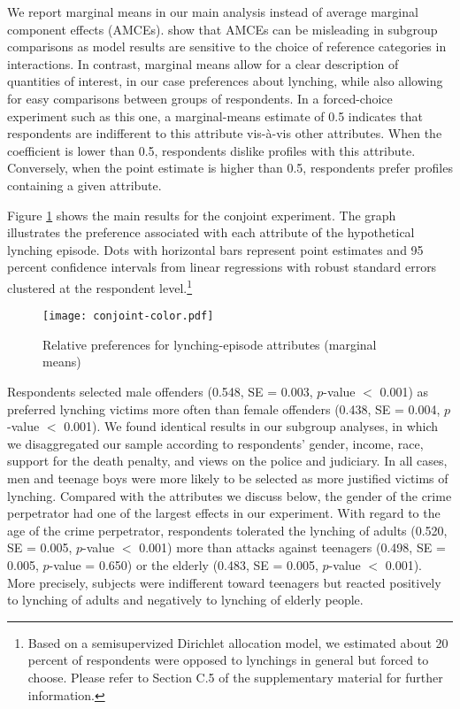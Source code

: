 \documentclass[12pt,a4paper]{article}
\begin{document}
We report marginal means in our main analysis instead of average marginal
component effects (AMCEs). \citet{leeper2018subgroup} show that AMCEs can be
misleading in subgroup comparisons as model results are sensitive to the choice
of reference categories in interactions. In contrast, marginal means allow for
a clear description of quantities of interest, in our case preferences about
lynching, while also allowing for easy comparisons between groups of
respondents. In a forced-choice experiment such as this one, a marginal-means
estimate of 0.5 indicates that respondents are indifferent to this attribute
vis-à-vis other attributes. When the coefficient is lower than 0.5, respondents
dislike profiles with this attribute. Conversely, when the point estimate is
higher than 0.5, respondents prefer profiles containing a given attribute.

Figure \ref{fig:exp01} shows the main results for the conjoint experiment. The
graph illustrates the preference associated with each attribute of the
hypothetical lynching episode. Dots with horizontal bars represent point
estimates and 95 percent confidence intervals from linear regressions with
robust standard errors clustered at the respondent level.\footnote{Based on a
semisupervized Dirichlet allocation model, we estimated about 20 percent of
respondents were opposed to lynchings in general but forced to choose. Please
refer to Section C.5 of the supplementary material for further information.}

\begin{figure}[ht]
\texttt{[image: conjoint-color.pdf]}
\caption{Relative preferences for lynching-episode attributes (marginal means)}
\centering
\label{fig:exp01}
\end{figure}

Respondents selected male offenders (0.548, SE = 0.003, $p$-value $<$ 0.001) as
preferred lynching victims more often than female offenders (0.438, SE = 0.004,
$p$-value $<$ 0.001). We found identical results in our subgroup analyses, in
which we disaggregated our sample according to respondents' gender, income,
race, support for the death penalty, and views on the police and judiciary. In
all cases, men and teenage boys were more likely to be selected as more
justified victims of lynching. Compared with the attributes we discuss below,
the gender of the crime perpetrator had one of the largest effects in our
experiment. With regard to the age of the crime perpetrator, respondents
tolerated the lynching of adults (0.520, SE = 0.005, $p$-value $<$ 0.001) more
than attacks against teenagers (0.498, SE = 0.005, $p$-value = 0.650) or the
elderly (0.483, SE = 0.005, $p$-value $<$ 0.001). More precisely, subjects were
indifferent toward teenagers but reacted positively to lynching of adults and
negatively to lynching of elderly people.
\end{document}
